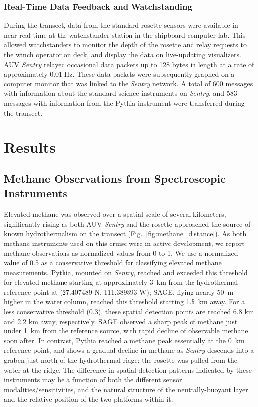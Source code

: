 \subsubsection{Real-Time Data Feedback and Watchstanding}
During the transect, data from the standard rosette sensors were available in near-real time at the watchstander station in the shipboard computer lab. This allowed watchstanders to monitor the depth of the rosette and relay requests to the winch operator on deck, and display the data on live-updating visualizers. AUV \emph{Sentry} relayed occasional data packets up to 128 bytes in length at a rate of approximately 0.01 Hz. These data packets were subsequently graphed on a computer monitor that was linked to the \emph{Sentry} network. A total of 600 messages with information about the standard science instruments on \emph{Sentry}, and 583 messages with information from the Pythia instrument were transferred during the transect.

\section{Results}

\subsection{Methane Observations from Spectroscopic Instruments}
\label{sec:methane_results}
Elevated methane was observed over a spatial scale of several kilometers, significantly rising as both AUV \emph{Sentry} and the rosette approached the source of known hydrothermalism on the transect (Fig.~\ref{fig:methane_distance}). As both methane instruments used on this cruise were in active development, we report methane observations as normalized values from 0 to 1. We use a normalized value of 0.5 as a conservative threshold for classifying elevated methane measurements. Pythia, mounted on \emph{Sentry}, reached and exceeded this threshold for elevated methane starting at approximately \SI{3}{\kilo\meter} from the hydrothermal reference point at (27.407489 N, 111.389893 W); SAGE, flying nearly \SI{50}{\meter} higher in the water column, reached this threshold starting \SI{1.5}{\kilo\meter} away. For a less conservative threshold (0.3), these spatial detection points are reached 6.8 km and 2.2 km away, respectively. SAGE observed a sharp peak of methane just under \SI{1}{\kilo\meter} from the reference source, with rapid decline of observable methane soon after. In contrast, Pythia reached a methane peak essentially at the \SI{0}{\kilo\meter} reference point, and shows a gradual decline in methane as \emph{Sentry} descends into a graben just north of the hydrothermal ridge; the rosette was pulled from the water at the ridge. The difference in spatial detection patterns indicated by these instruments may be a function of both the different sensor modalities/sensitivities, and the natural structure of the neutrally-buoyant layer and the relative position of the two platforms within it. 

